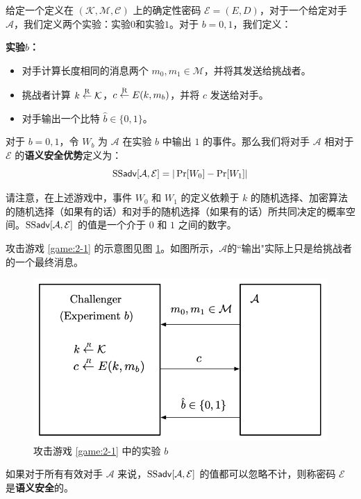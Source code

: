 \begin{game}[语义安全性]\label{game:2-1}
给定一个定义在 $(\mathcal{K},\mathcal{M},\mathcal{C})$ 上的确定性密码 $\mathcal{E}=(E,D)$，对于一个给定对手 $\mathcal{A}$，我们定义两个实验：实验$0$和实验$1$。对于 $b=0,1$，我们定义：

\noindent\textbf{实验$b$：}
\begin{itemize}
	\item 对手计算长度相同的消息两个 $m_0,m_1\in\mathcal{M}$，并将其发送给挑战者。
	\item 挑战者计算 $k\overset{\rm R}\leftarrow\mathcal{K}$，$c\overset{\rm R}\leftarrow E(k,m_b)$，并将 $c$ 发送给对手。
	\item 对手输出一个比特 $\hat b\in\{0,1\}$。
\end{itemize}

对于 $b=0,1$，令 $W_b$ 为 $\mathcal{A}$ 在实验 $b$ 中输出 $1$ 的事件。那么我们将对手 $\mathcal{A}$ 相对于 $\mathcal{E}$ 的\textbf{语义安全优势}定义为：
$$
{\rm SS\mathsf{adv}}[\mathcal{A},\mathcal{E}]=|\Pr[W_0] -\Pr[W_1]|
$$
\end{game}

请注意，在上述游戏中，事件 $W_0$ 和 $W_1$ 的定义依赖于 $k$ 的随机选择、加密算法的随机选择（如果有的话）和对手的随机选择（如果有的话）所共同决定的概率空间。${\rm SS\mathsf{adv}}[\mathcal{A},\mathcal{E}]$ 的值是一个介于 $0$ 和 $1$ 之间的数字。

攻击游戏 \ref{game:2-1} 的示意图见图 \ref{fig:2-1}。如图所示，$\mathcal{A}$的``输出"实际上只是给挑战者的一个最终消息。

\begin{figure}
  \centering
  \includegraphics[width=0.5\linewidth]{figures/chapter2/fig1.png}
  \caption{攻击游戏 \ref{game:2-1} 中的实验 $b$}
  \label{fig:2-1}
\end{figure}

\begin{definition}[语义安全性]\label{def:2-2}
如果对于所有有效对手 $\mathcal{A}$ 来说，${\rm SS\mathsf{adv}}[\mathcal{A},\mathcal{E}]$ 的值都可以忽略不计，则称密码 $\mathcal{E}$ 是\textbf{语义安全}的。
\end{definition}

